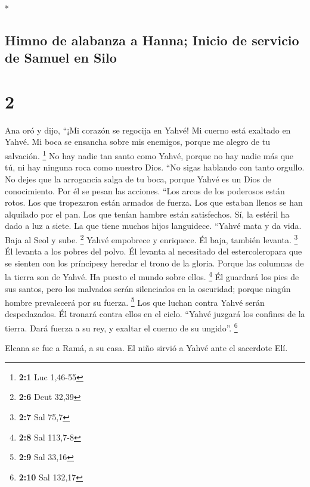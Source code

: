 \begin{paracol}{2}
\begin{otherlanguage}{english}
\end{otherlanguage}

\switchcolumn[0]*

\hypertarget{himno-de-alabanza-a-hanna-inicio-de-servicio-de-samuel-en-silo}{%
\subsection{Himno de alabanza a Hanna; Inicio de servicio de Samuel en
Silo}\label{himno-de-alabanza-a-hanna-inicio-de-servicio-de-samuel-en-silo}}

\hypertarget{section-2}{%
\section{2}\label{section-2}}

 Ana oró y dijo, ``¡Mi corazón se regocija en Yahvé! Mi
cuerno está exaltado en Yahvé. Mi boca se ensancha sobre mis enemigos,
porque me alegro de tu salvación. \footnote{\textbf{2:1} Luc 1,46-55}
 No hay nadie tan santo como Yahvé, porque no hay nadie
más que tú, ni hay ninguna roca como nuestro Dios.  ``No
sigas hablando con tanto orgullo. No dejes que la arrogancia salga de tu
boca, porque Yahvé es un Dios de conocimiento. Por él se pesan las
acciones.  ``Los arcos de los poderosos están rotos. Los
que tropezaron están armados de fuerza.  Los que estaban
llenos se han alquilado por el pan. Los que tenían hambre están
satisfechos. Sí, la estéril ha dado a luz a siete. La que tiene muchos
hijos languidece.  ``Yahvé mata y da vida. Baja al Seol y
sube. \footnote{\textbf{2:6} Deut 32,39}  Yahvé empobrece
y enriquece. Él baja, también levanta. \footnote{\textbf{2:7} Sal 75,7}
 Él levanta a los pobres del polvo. Él levanta al
necesitado del estercoleropara que se sienten con los príncipesy heredar
el trono de la gloria. Porque las columnas de la tierra son de Yahvé. Ha
puesto el mundo sobre ellos. \footnote{\textbf{2:8} Sal 113,7-8}
 Él guardará los pies de sus santos, pero los malvados
serán silenciados en la oscuridad; porque ningún hombre prevalecerá por
su fuerza. \footnote{\textbf{2:9} Sal 33,16}  Los que
luchan contra Yahvé serán despedazados. Él tronará contra ellos en el
cielo. ``Yahvé juzgará los confines de la tierra. Dará fuerza a su rey,
y exaltar el cuerno de su ungido''. \footnote{\textbf{2:10} Sal 132,17}

 Elcana se fue a Ramá, a su casa. El niño sirvió a Yahvé
ante el sacerdote Elí.


\end{paracol}
